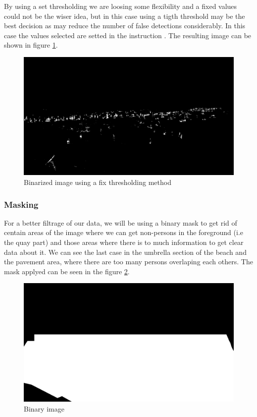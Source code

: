 \documentclass[10pt]{article}
\begin{document}
By using a set thresholding we are loosing some flexibility and a fixed values could not be the wiser idea, but in this case using a tigth threshold may be the best decision as may reduce the number of false detections considerably. In this case the values selected are setted in the instruction . The resulting image can be shown in figure \ref{fig:binth}.


\begin{figure}[htb]
    \centering
    \includegraphics[width=\textwidth]{img/bin_th.jpg}
    \caption{Binarized image using a fix thresholding method}
    \label{fig:binth}
\end{figure}

\subsubsection*{Masking}
For a better filtrage of our data, we will be using a binary mask to get rid of centain areas of the image where we can get non-persons in the foreground (i.e the quay part) and those areas where there is to much information to get clear data about it. We can see the last case in the umbrella section of the beach and the pavement area, where there are too many persons overlaping each others. The mask applyed can be seen in the figure \ref{fig:mask_ex}.

\begin{figure}[htb]
    \centering
    \includegraphics[width=\textwidth]{../mask.png}
    \caption{Binary image}
    \label{fig:mask_ex}
\end{figure}
\end{document}
